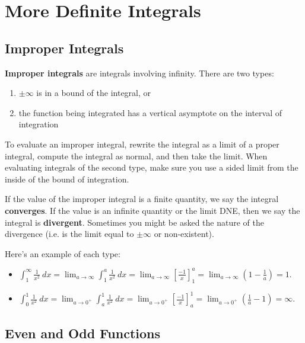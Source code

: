 \section{More Definite Integrals}

\subsection{Improper Integrals}

\textbf{Improper integrals} are integrals involving infinity. There are two types:
\begin{enumerate}
    \item $\pm\infty$ is in a bound of the integral, or
    \item the function being integrated has a vertical asymptote on the interval of integration
\end{enumerate}


To evaluate an improper integral, rewrite the integral as a limit of a proper integral, compute the integral as normal, and then take the limit. When evaluating integrals of the second type, make sure you use a sided limit from the inside of the bound of integration.

If the value of the improper integral is a finite quantity, we say the integral \textbf{converges}. If the value is an infinite quantity or the limit DNE, then we say the integral is \textbf{divergent}. Sometimes you might be asked the nature of the divergence (i.e. is the limit equal to $\pm\infty$ or non-existent).

Here's an example of each type:

\begin{itemize}%
    \item $\displaystyle \int_1^\infty \frac{1}{x^2}\ dx
     = \lim_{a\to \infty}\int_1^a \frac{1}{x^2}\ dx 
     = \lim_{a\to \infty}\left[\frac{-1}{x}\right]_1^a 
     = \lim_{a\to \infty} \left(1-\frac{1}{a}\right)
    =1.$
    \item $\displaystyle\int_{0}^{1}\frac{1}{x^{2}}\ dx 
     = \lim_{a\to 0^+} \int_{a}^{1}\frac{1}{x^{2}}\ dx 
     = \lim_{a\to 0^+}\left[\frac{-1}{x}\right]_a^1 
     = \lim_{a\to 0^+}\left(\frac{1}{a}-1\right)
     = \infty.$
\end{itemize}




\subsection{Even and Odd Functions}


